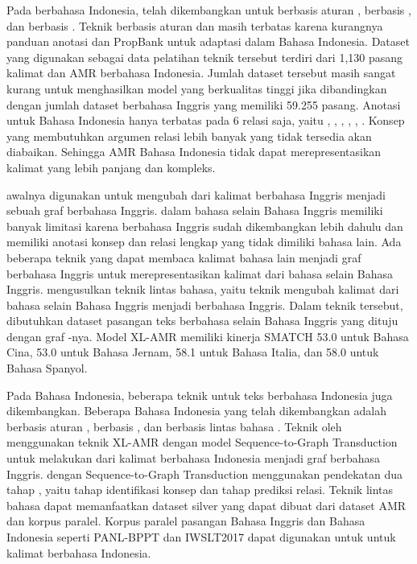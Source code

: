 Pada \AMR{} berbahasa Indonesia, telah dikembangkan untuk  berbasis aturan , berbasis  , dan berbasis \crosslingual{} .
Teknik \amrparsing{} berbasis aturan dan  masih terbatas karena kurangnya panduan anotasi dan PropBank untuk adaptasi \AMR{} dalam Bahasa Indonesia.
Dataset yang digunakan sebagai data pelatihan teknik tersebut terdiri dari 1,130 pasang kalimat dan AMR berbahasa Indonesia.
Jumlah dataset tersebut masih sangat kurang untuk menghasilkan model yang berkualitas tinggi jika dibandingkan dengan jumlah dataset berbahasa Inggris yang memiliki 59.255 pasang.
Anotasi untuk \AMR{} Bahasa Indonesia hanya terbatas pada 6 relasi saja, yaitu , , , , ,  .
Konsep yang membutuhkan argumen relasi lebih banyak yang tidak tersedia akan diabaikan.
Sehingga AMR Bahasa Indonesia tidak dapat merepresentasikan kalimat yang lebih panjang dan kompleks.

\amrparsing{} awalnya digunakan untuk mengubah dari kalimat berbahasa Inggris menjadi sebuah graf \AMR{} berbahasa Inggris.
\AMR{} dalam bahasa selain Bahasa Inggris memiliki banyak limitasi karena \AMR{} berbahasa Inggris sudah dikembangkan lebih dahulu dan memiliki anotasi konsep dan relasi lengkap yang tidak dimiliki \AMR{} bahasa lain.
Ada beberapa teknik yang dapat membaca kalimat bahasa lain menjadi graf \AMR{} berbahasa Inggris untuk merepresentasikan kalimat dari bahasa selain Bahasa Inggris.
\textcite{damonte2018} mengusulkan teknik \amrparsing{} lintas bahasa, yaitu teknik mengubah kalimat dari bahasa selain Bahasa Inggris menjadi \AMR{} berbahasa Inggris.
Dalam teknik tersebut, dibutuhkan dataset pasangan teks berbahasa selain Bahasa Inggris yang dituju dengan graf \AMR{}-nya.
Model \gls{XL-AMR} memiliki kinerja SMATCH 53.0 untuk Bahasa Cina, 53.0 untuk Bahasa Jernam, 58.1 untuk Bahasa Italia, dan 58.0 untuk Bahasa Spanyol.

Pada Bahasa Indonesia, beberapa teknik \amrparsing{} untuk teks berbahasa Indonesia juga dikembangkan.
Beberapa \amrparsing{} Bahasa Indonesia yang telah dikembangkan adalah \amrparsing{} berbasis aturan , berbasis  , dan berbasis lintas bahasa .
Teknik \amrparsing{} oleh \textcite{putra2022} menggunakan teknik  \gls{XL-AMR}  dengan model Sequence-to-Graph Transduction  untuk melakukan \amrparsing{} dari kalimat berbahasa Indonesia menjadi graf \AMR{} berbahasa Inggris.
\amrparsing{} dengan Sequence-to-Graph Transduction  menggunakan pendekatan dua tahap , yaitu tahap identifikasi konsep dan tahap prediksi relasi.
Teknik \amrparsing{} lintas bahasa dapat memanfaatkan dataset silver yang dapat dibuat dari dataset AMR dan korpus paralel.
Korpus paralel pasangan Bahasa Inggris dan Bahasa Indonesia seperti PANL-BPPT  dan IWSLT2017  dapat digunakan untuk \amrparsing{} untuk kalimat berbahasa Indonesia.

